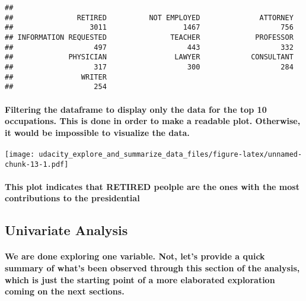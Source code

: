 \documentclass[]{article}
\let\oldparagraph\paragraph
\renewcommand{\paragraph}[1]{\oldparagraph{#1}\mbox{}}
\begin{document}
\begin{verbatim}
## 
##               RETIRED          NOT EMPLOYED              ATTORNEY 
##                  3011                  1467                   756 
## INFORMATION REQUESTED               TEACHER             PROFESSOR 
##                   497                   443                   332 
##             PHYSICIAN                LAWYER            CONSULTANT 
##                   317                   300                   284 
##                WRITER 
##                   254
\end{verbatim}

\paragraph{Filtering the dataframe to display only the data for the top
10 occupations. This is done in order to make a readable plot.
Otherwise, it would be impossible to visualize the
data.}\label{filtering-the-dataframe-to-display-only-the-data-for-the-top-10-occupations.-this-is-done-in-order-to-make-a-readable-plot.-otherwise-it-would-be-impossible-to-visualize-the-data.}

\texttt{[image: udacity\_explore\_and\_summarize\_data\_files/figure-latex/unnamed-chunk-13-1.pdf]}

\paragraph{This plot indicates that RETIRED peolple are the ones with
the most contributions to the
presidential}\label{this-plot-indicates-that-retired-peolple-are-the-ones-with-the-most-contributions-to-the-presidential}

\subsection{Univariate Analysis}\label{univariate-analysis}

\paragraph{We are done exploring one variable. Not, let's provide a
quick summary of what's been observed through this section of the
analysis, which is just the starting point of a more elaborated
exploration coming on the next
sections.}\label{we-are-done-exploring-one-variable.-not-lets-provide-a-quick-summary-of-whats-been-observed-through-this-section-of-the-analysis-which-is-just-the-starting-point-of-a-more-elaborated-exploration-coming-on-the-next-sections.}
\end{document}
